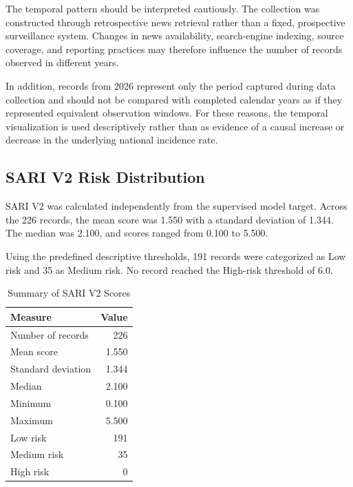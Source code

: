 \documentclass[conference]{IEEEtran}
\begin{document}
The temporal pattern should be interpreted cautiously. The collection was
constructed through retrospective news retrieval rather than a fixed,
prospective surveillance system. Changes in news availability, search-engine
indexing, source coverage, and reporting practices may therefore influence
the number of records observed in different years.

In addition, records from 2026 represent only the period captured during data
collection and should not be compared with completed calendar years as if
they represented equivalent observation windows. For these reasons, the
temporal visualization is used descriptively rather than as evidence of a
causal increase or decrease in the underlying national incidence rate.

\subsection{SARI V2 Risk Distribution}

SARI V2 was calculated independently from the supervised model target. Across
the 226 records, the mean score was 1.550 with a standard deviation of 1.344.
The median was 2.100, and scores ranged from 0.100 to 5.500.

Using the predefined descriptive thresholds, 191 records were categorized as
Low risk and 35 as Medium risk. No record reached the High-risk threshold of
6.0.

\begin{table}[!t]
\centering
\caption{Summary of SARI V2 Scores}
\label{tab:sari_summary}
\renewcommand{\arraystretch}{1.15}
\begin{tabular}{lr}
\toprule
\textbf{Measure} & \textbf{Value} \\
\midrule
Number of records & 226 \\
Mean score         & 1.550 \\
Standard deviation & 1.344 \\
Median             & 2.100 \\
Minimum            & 0.100 \\
Maximum            & 5.500 \\
\midrule
Low risk           & 191 \\
Medium risk        & 35 \\
High risk          & 0 \\
\bottomrule
\end{tabular}
\end{table}
\end{document}
